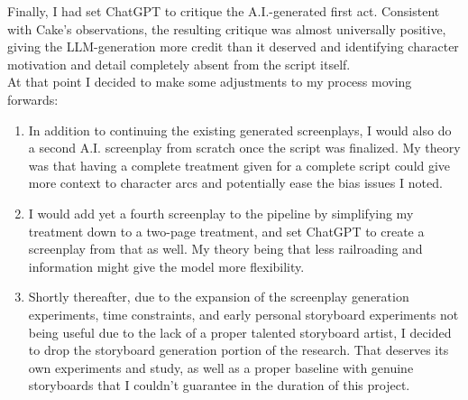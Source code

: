 \documentclass[sigconf]{acmart}
\begin{document}
\indent Finally, I had set ChatGPT to critique the A.I.-generated first act. Consistent with Cake's observations, the resulting critique was almost universally positive, giving the LLM-generation more credit than it deserved and identifying character motivation and detail completely absent from the script itself.\\
\indent At that point I decided to make some adjustments to my process moving forwards:
\begin{enumerate}
    \item In addition to continuing the existing generated screenplays, I would also do a second A.I. screenplay from scratch once the script was finalized. My theory was that having a complete treatment given for a complete script could give more context to character arcs and potentially ease the bias issues I noted.
    \item I would add yet a fourth screenplay to the pipeline by simplifying my treatment down to a two-page treatment, and set ChatGPT to create a screenplay from that as well. My theory being that less railroading and information might give the model more flexibility.
    \item Shortly thereafter, due to the expansion of the screenplay generation experiments, time constraints, and early personal storyboard experiments not being useful due to the lack of a proper talented storyboard artist, I decided to drop the storyboard generation portion of the research. That deserves its own experiments and study, as well as a proper baseline with genuine storyboards that I couldn't guarantee in the duration of this project.
\end{enumerate}
\end{document}
